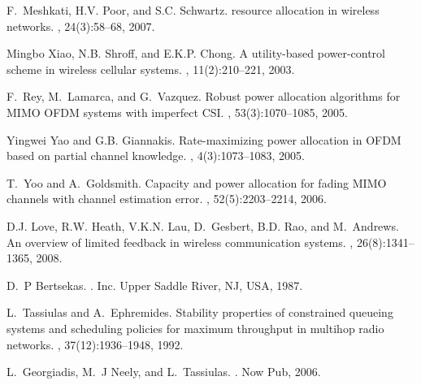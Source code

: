 \documentclass[11pt,journal, onecolumn]{./IEEEtran}
\begin{document}
    



\begin{thebibliography}{10}

F.~Meshkati, {H.V.} Poor, and {S.C.} Schwartz.
 resource allocation in wireless networks.
, 24(3):58--68, 2007.

Mingbo Xiao, {N.B.} Shroff, and {E.K.P.} Chong.
\newblock A utility-based power-control scheme in wireless cellular systems.
, 11(2):210--221, 2003.

F.~Rey, M.~Lamarca, and G.~Vazquez.
\newblock Robust power allocation algorithms for {MIMO} {OFDM} systems with
  imperfect {CSI}.
, 53(3):1070--1085,
  2005.

Yingwei Yao and {G.B.} Giannakis.
\newblock Rate-maximizing power allocation in {OFDM} based on partial channel
  knowledge.
,
  4(3):1073--1083, 2005.

T.~Yoo and A.~Goldsmith.
\newblock Capacity and power allocation for fading {MIMO} channels with channel
  estimation error.
, 52(5):2203--2214,
  2006.

{D.J.} Love, {R.W.} Heath, {V.K.N.} Lau, D.~Gesbert, {B.D.} Rao, and
  M.~Andrews.
\newblock An overview of limited feedback in wireless communication systems.
,
  26(8):1341--1365, 2008.

D.~P Bertsekas.
.
 Inc. Upper Saddle River, {NJ,} {USA}, 1987.

L.~Tassiulas and A.~Ephremides.
\newblock Stability properties of constrained queueing systems and scheduling
  policies for maximum throughput in multihop radio networks.
, 37(12):1936--1948,
  1992.

L.~Georgiadis, M.~J Neely, and L.~Tassiulas.
.
\newblock Now Pub, 2006.


\end{thebibliography}
\end{document}
